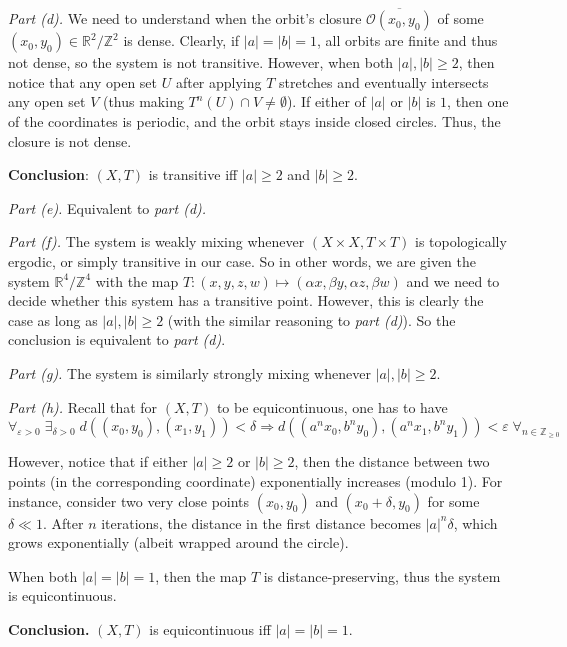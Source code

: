 \documentclass{template}
\begin{document}
\textit{Part (d).} We need to understand when the orbit's closure
$\overline{\mathcal{O}(x_0,y_0)}$ of some $(x_0,y_0) \in
\mathbb{R}^2/\mathbb{Z}^2$ is dense. Clearly, if $|a|=|b|=1$, all orbits are
finite and thus not dense, so the system is not transitive. However, when both
$|a|, |b| \geq 2$, then notice that any open set $U$ after applying $T$
stretches and eventually intersects any open set $V$ (thus making $T^n(U) \cap V
\neq \emptyset$). If either of $|a|$ or $|b|$ is $1$, then one of the
coordinates is periodic, and the orbit stays inside closed circles. Thus, the
closure is not dense.

\textbf{Conclusion}: $(X, T)$ is transitive iff $|a| \geq 2$ and $|b| \geq 2$.

\textit{Part (e).} Equivalent to \textit{part (d).}

\textit{Part (f).} The system is weakly mixing whenever $(X \times X, T \times
T)$ is topologically ergodic, or simply transitive in our case. So in other
words, we are given the system $\mathbb{R}^4/\mathbb{Z}^4$ with the map
$T:(x,y,z,w) \mapsto (\alpha x, \beta y, \alpha z, \beta w)$ and we need to
decide whether this system has a transitive point. However, this is clearly the
case as long as $|a|, |b| \geq 2$ (with the similar reasoning to \textit{part
(d)}). So the conclusion is equivalent to \textit{part (d)}.

\textit{Part (g).}  The system is similarly strongly mixing whenever $|a|, |b|
\geq 2$.

\textit{Part (h).} Recall that for $(X,T)$ to be equicontinuous, one has to have
\begin{equation*}
    \forall_{\varepsilon > 0} \; \exists_{\delta > 0} \; d((x_0,y_0),(x_1,y_1))<\delta \Rightarrow d((a^nx_0,b^ny_0), (a^nx_1,b^ny_1))<\varepsilon \; \forall_{n \in \mathbb{Z}_{\geq 0}}
\end{equation*}

However, notice that if either $|a| \geq 2$ or $|b| \geq 2$, then the distance
between two points (in the corresponding coordinate) exponentially increases
(modulo 1). For instance, consider two very close points $(x_0,y_0)$ and
$(x_0+\delta,y_0)$ for some $\delta \ll 1$. After $n$ iterations, the distance
in the first distance becomes $|a|^n\delta$, which grows exponentially (albeit
wrapped around the circle).  

When both $|a|=|b|=1$, then the map $T$ is distance-preserving, thus the 
system is equicontinuous.

\textbf{Conclusion.} $(X,T)$ is equicontinuous iff $|a|=|b|=1$.
\end{document}
